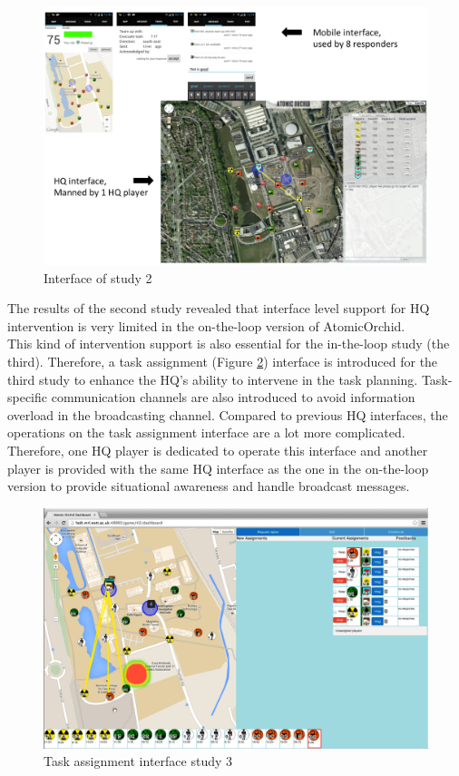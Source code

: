 \begin{figure}[H]
  \centering
  \includegraphics[width=1\textwidth]{img/conclusion/study2interface}
  \caption{Interface of study 2}
  \label{fig:study2interface}
\end{figure}

The results of the second study revealed that interface level support for HQ intervention is very limited in the on-the-loop version of AtomicOrchid. \\

This kind of intervention support is also essential for the in-the-loop study (the third). Therefore, a task assignment (Figure \ref{fig:study3interfaceHQ}) interface is introduced for the third study to enhance the HQ's ability to intervene in the task planning. Task-specific communication channels are also introduced to avoid information overload in the broadcasting channel. Compared to previous HQ interfaces, the operations on the task assignment interface are a lot more complicated. Therefore, one HQ player is dedicated to operate this interface and another player is provided with the same HQ interface as the one in the on-the-loop version to provide situational awareness and handle broadcast messages. 

\begin{figure}[H]
  \centering
  \includegraphics[width=1\textwidth]{img/conclusion/study3interfaceHQ}
  \caption{Task assignment interface study 3}
  \label{fig:study3interfaceHQ}
\end{figure}

